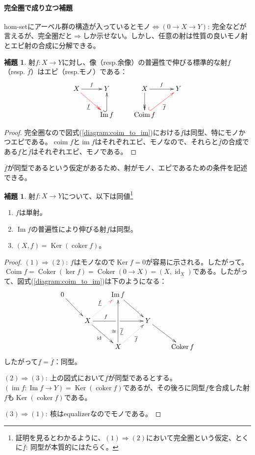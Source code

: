 \documentclass[a4paper,11pt]{jsarticle}
\theoremstyle{definition}
\newtheorem{lem}[thm]{補題}
\DeclareMathOperator{\id}{\mathrm{id}}
\DeclareMathOperator{\Ima}{\mathrm{Im}}
\DeclareMathOperator{\im}{\mathrm{im}}
\DeclareMathOperator{\Coker}{\mathrm{Coker}}
\DeclareMathOperator{\coker}{\mathrm{coker}}
\DeclareMathOperator{\Coim}{\mathrm{Coim}}
\DeclareMathOperator{\coim}{\mathrm{coim}}
\DeclareMathOperator{\Ker}{\mathrm{Ker}}
\renewcommand{\ker}{\mathop{\mathrm{ker}}}
\newcommand{\ou}[1]{\overline{\underline{#1}}}
\begin{document}
\paragraph{完全圏で成り立つ補題}

hom-setにアーベル群の構造が入っているとモノ$\Leftrightarrow(0\to X\to Y):\ 完全$などが言えるが、完全圏だと$\Rightarrow$しか示せない。しかし、任意の射は性質の良いモノ射とエピ射の合成に分解できる。

\begin{lem}
射$f\colon X\to Y$に対し、像（resp.余像）の普遍性で伸びる標準的な射$\underline{f}$（resp. $\overline{f}$）はエピ（resp.モノ）である：\[\xymatrix{
  X\ar[r]^f\ar@[red]@{->>}[rd]_{\underline{f}}&Y&X\ar[r]^{f}\ar@{->>}[d]&Y\\
  &\Ima f\ar@{^(->}[u]&\Coim f\ar@{^(->}@[red][ur]_{\overline{f}}&
}\]
\end{lem}
\begin{proof}
  完全圏なので図式(\ref{diagram:coim_to_im})における$\ou{f}$は同型、特にモノかつエピである。$\coim f$と$\im f$はそれぞれエピ、モノなので、それらと$\ou{f}$の合成である$\underline{f}$と$\overline{f}$はそれぞれエピ、モノである。
\end{proof}

$\ou{f}$が同型であるという仮定があるため、射がモノ、エピであるための条件を記述できる。

\begin{lem}\label{lem:chalacterizationOfMono}
  射$f\colon X\to Y$について、以下は同値\footnote{証明を見るとわかるように、$(1)\Rightarrow(2)$において完全圏という仮定、とくに$\ou{f}:\ $同型が本質的にはたらく。}
  \begin{enumerate}[label=(\arabic*)]
    \item $f$は単射。
    \item $\Ima f$の普遍性により伸びる射$\underline f$は同型。
    \item $(X,f)=\Ker(\coker f)$。
  \end{enumerate}
\end{lem}
\begin{proof}
  $(1)\Rightarrow(2):\ $$f$はモノなので$\Ker f=0$が容易に示される。したがって。$\Coim f=\Coker(\ker f)=\Coker(0\to X)=(X,\id_X)$である。したがって、図式(\ref{diagram:coim_to_im})は下のようになる：\[
    \xymatrix{
      0 \ar[rd] & & \Ima f \ar[rd] & & \\
      & X \ar[rd]_{\id} \ar[rr]^(.3){f}|\hole \ar@{.>}@[red][ru]^{\underline{f}} & & Y \ar[rd] & \\
      & & X \ar@{.>}[ru]_{\overline{f}} \ar[uu]_(.3){\ou{f}}^(.3){\cong}& & \Coker f
    }
  \]
  したがって$\underline{f}=\ou{f}$：同型。

$(2)\Rightarrow(3):\ $上の図式において$\underline f$が同型であるとする。$(\im f\colon \Ima f\to Y)=\Ker(\coker f)$であるが、その後ろに同型$\underline{f}$を合成した射$f$も$\Ker(\coker f)$である。

$(3)\Rightarrow(1):\ $核はequalizerなのでモノである。
\end{proof}
\end{document}

